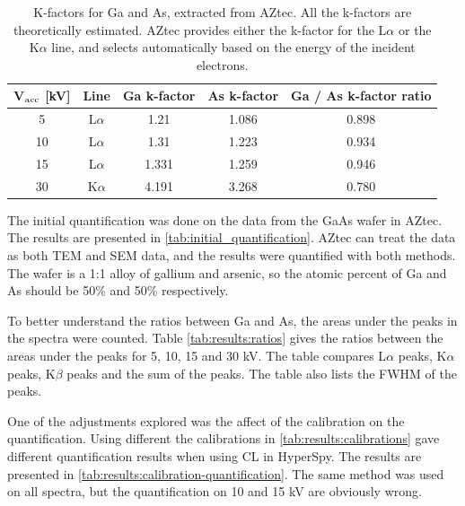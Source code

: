 \begin{table}[h]
    \centering
    \caption{
        K-factors for Ga and As, extracted from AZtec.
        All the k-factors are theoretically estimated.
        AZtec provides either the k-factor for the L$\alpha$ or the K$\alpha$ line, and selects automatically based on the energy of the incident electrons.
    }
    \label{tab:results:k-factors}
    \begin{tabular}{ccccc}
        V$_\textnormal{acc}$ [kV] & Line      & Ga k-factor & As k-factor & Ga / As k-factor ratio \\
        \hline
        5                         & L$\alpha$ & 1.21        & 1.086       & 0.898                  \\
        10                        & L$\alpha$ & 1.31        & 1.223       & 0.934                  \\
        15                        & L$\alpha$ & 1.331       & 1.259       & 0.946                  \\
        30                        & K$\alpha$ & 4.191       & 3.268       & 0.780
    \end{tabular}
\end{table}

The initial quantification was done on the data from the GaAs wafer in AZtec.
The results are presented in \cref{tab:initial_quantification}.
AZtec can treat the data as both TEM and SEM data, and the results were quantified with both methods.
The wafer is a 1:1 alloy of gallium and arsenic, so the atomic percent of Ga and As should be 50\% and 50\% respectively.


To better understand the ratios between Ga and As, the areas under the peaks in the spectra were counted.
Table \cref{tab:results:ratios} gives the ratios between the areas under the peaks for 5, 10, 15 and 30 kV.
The table compares L$\alpha$ peaks, K$\alpha$ peaks, K$\beta$ peaks and the sum of the peaks.
The table also lists the FWHM of the peaks.




One of the adjustments explored was the affect of the calibration on the quantification.
Using different the calibrations in \cref{tab:results:calibrations} gave different quantification results when using CL in HyperSpy. %
The results are presented in \cref{tab:results:calibration-quantification}.
The same method was used on all spectra, but the quantification on 10 and 15 kV are obviously wrong.










